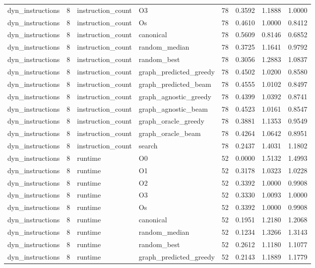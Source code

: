 \begin{table}[t]
\begin{tabular}{lrllrrrr}
dyn\_instructions & 8 & instruction\_count & O3 & 78 & 0.3592 & 1.1888 & 1.0000 \\
dyn\_instructions & 8 & instruction\_count & Os & 78 & 0.4610 & 1.0000 & 0.8412 \\
dyn\_instructions & 8 & instruction\_count & canonical & 78 & 0.5609 & 0.8146 & 0.6852 \\
dyn\_instructions & 8 & instruction\_count & random\_median & 78 & 0.3725 & 1.1641 & 0.9792 \\
dyn\_instructions & 8 & instruction\_count & random\_best & 78 & 0.3056 & 1.2883 & 1.0837 \\
dyn\_instructions & 8 & instruction\_count & graph\_predicted\_greedy & 78 & 0.4502 & 1.0200 & 0.8580 \\
dyn\_instructions & 8 & instruction\_count & graph\_predicted\_beam & 78 & 0.4555 & 1.0102 & 0.8497 \\
dyn\_instructions & 8 & instruction\_count & graph\_agnostic\_greedy & 78 & 0.4399 & 1.0392 & 0.8741 \\
dyn\_instructions & 8 & instruction\_count & graph\_agnostic\_beam & 78 & 0.4523 & 1.0161 & 0.8547 \\
dyn\_instructions & 8 & instruction\_count & graph\_oracle\_greedy & 78 & 0.3881 & 1.1353 & 0.9549 \\
dyn\_instructions & 8 & instruction\_count & graph\_oracle\_beam & 78 & 0.4264 & 1.0642 & 0.8951 \\
dyn\_instructions & 8 & instruction\_count & search & 78 & 0.2437 & 1.4031 & 1.1802 \\
dyn\_instructions & 8 & runtime & O0 & 52 & 0.0000 & 1.5132 & 1.4993 \\
dyn\_instructions & 8 & runtime & O1 & 52 & 0.3178 & 1.0323 & 1.0228 \\
dyn\_instructions & 8 & runtime & O2 & 52 & 0.3392 & 1.0000 & 0.9908 \\
dyn\_instructions & 8 & runtime & O3 & 52 & 0.3330 & 1.0093 & 1.0000 \\
dyn\_instructions & 8 & runtime & Os & 52 & 0.3392 & 1.0000 & 0.9908 \\
dyn\_instructions & 8 & runtime & canonical & 52 & 0.1951 & 1.2180 & 1.2068 \\
dyn\_instructions & 8 & runtime & random\_median & 52 & 0.1234 & 1.3266 & 1.3143 \\
dyn\_instructions & 8 & runtime & random\_best & 52 & 0.2612 & 1.1180 & 1.1077 \\
dyn\_instructions & 8 & runtime & graph\_predicted\_greedy & 52 & 0.2143 & 1.1889 & 1.1779 \\

\end{tabular}
\end{table}
